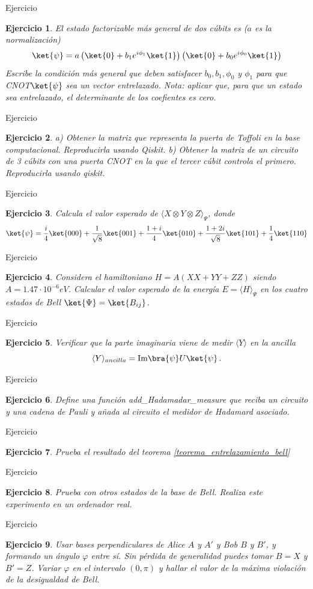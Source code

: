 \documentclass[a4paper,11pt]{book} %
\newtheorem{ejercicio_contador}{Ejercicio}
\newcommand{\Ejercicio}[1]{
		\begin{mybox_gray}{Ejercicio} 
			\begin{ejercicio_contador}
				 #1 
			\end{ejercicio_contador} 
		\end{mybox_gray}
	}
\numberwithin{equation}{chapter}
\def\lp{\left(}
\def\rp{\right)}
\begin{document}
\Ejercicio{
El estado factorizable más general de dos cúbits es ($a$ es la normalización)
\begin{equation}
\ket{\psi} = a \left(\ket{0} + b_1 e^{i\phi_1}\ket{1} \rp \lp \ket{0} + b_0 e^{i\phi_0} \ket{1} \right)
\end{equation}
Escribe la condición más general que deben satisfacer  $b_0,b_1,\phi_0$ y $\phi_1$ para que CNOT$\ket{\psi}$
sea un vector entrelazado. Nota: aplicar que, para que un estado sea entrelazado, el determinante de los coefientes es cero.
}

\Ejercicio{
a) Obtener la matriz que representa la puerta de Toffoli en la base computacional. Reproducirla usando Qiskit. b) Obtener la matriz de un circuito de 3 cúbits con una puerta CNOT en la que el tercer cúbit controla el primero. Reproducirla usando qiskit.
}

\Ejercicio{
Calcula el valor esperado de $\langle X\otimes Y\otimes Z\rangle_\Psi$, donde
\begin{equation}
\ket{\psi} = \frac{i}{4} \ket{000}+\frac{1}{\sqrt{8}} \ket{001}+\frac{1+i}{4} \ket{010}+
\frac{1+2i}{\sqrt{8}}\ket{101}+\frac{1}{4} \ket{110}
\end{equation}
}

\Ejercicio{
Considera el hamiltoniano $H=A(X X+Y Y+Z Z)$ siendo $A=1.47\cdot 10^{-6}eV$. Calcular el
valor esperado de la energía $E = \langle H\rangle_\Psi$  en los cuatro estados de Bell
$\ket{\Psi} = \ket{B_{ij}}$.
}

\Ejercicio{
Verificar que la parte imaginaria viene de medir  $\langle Y\rangle$ en la ancilla
\begin{equation}
\langle{Y}\rangle_{ancilla}  =  \hbox{Im}\bra{\psi} U \ket{\psi} \, .
\end{equation}
}

\Ejercicio{
Define una función add\_Hadamadar\_measure que reciba un circuito y una  cadena de Pauli y añada al
circuito el medidor de Hadamard asociado.
}

\Ejercicio{
Prueba el resultado del teorema \ref{teorema_entrelazamiento_bell}
}

\Ejercicio{
Prueba con otros estados de la base de Bell. Realiza este experimento en un ordenador real.
}

\Ejercicio{
Usar bases perpendiculares de  Alice $A$ y $A'$  y Bob $B$ y $B'$, y formando un ángulo $\varphi$ entre sí. Sin pérdida de generalidad puedes tomar $B = X$ y $B' = Z$. Variar $\varphi$ en el intervalo $(0,\pi)$ y hallar el valor de la máxima violación de la desigualdad de Bell.
}
\end{document}
